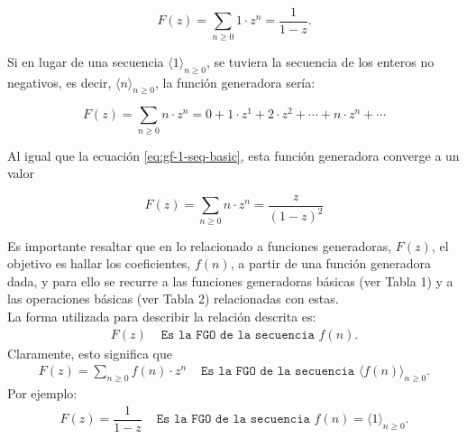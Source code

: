 \begin{equation}
    F(z) = \sum_{n\geq0}{1\cdot z^n} = \frac{1}{1-z}.
\end{equation}

Si en lugar de una secuencia $\langle 1\rangle_{n\ge 0}$, se tuviera la secuencia de los enteros no negativos, es decir, $\langle n\rangle_{n\ge 0}$, la función generadora sería:

\begin{equation}
    \label{eq:gf-N-seq-basic}
    F(z)= \sum_{n\geq0}{n \cdot z^n} = 0 + 1\cdot z^1 + 2\cdot z^2 + \cdots +  n\cdot z^n + \cdots 
\end{equation}

Al igual que la ecuación \eqref{eq:gf-1-seq-basic}, esta función generadora converge a un valor

\begin{equation}
    F(z)= \sum_{n\geq0}{n\cdot z^n} = \frac{z}{(1-z)^2}
\end{equation}

Es importante resaltar que en lo relacionado a funciones generadoras, $F(z)$, el objetivo es hallar los coeficientes, $f(n)$, a partir de una función generadora dada, y para ello se recurre a las funciones generadoras básicas (ver Tabla 1) y a las operaciones básicas (ver Tabla 2) relacionadas con estas.\\

La forma utilizada para describir la relación descrita es:
\begin{align*}
    F(z)&\texttt{ Es la FGO de la secuencia }f(n).
\end{align*}
Claramente, esto significa que
\begin{align*}
    F(z)=\sum_{n\geq0}{f(n)\cdot z^n} & \texttt{ Es la FGO de la secuencia } \langle f(n) \rangle_{n\ge 0}.
\end{align*}
Por ejemplo:
\begin{align*}
    F(z)=\dfrac{1}{1-z}&\texttt{ Es la FGO de la secuencia }f(n)=\langle 1 \rangle_{n\ge 0}.
\end{align*}
\newpage
\renewcommand{\arraystretch}{2}

